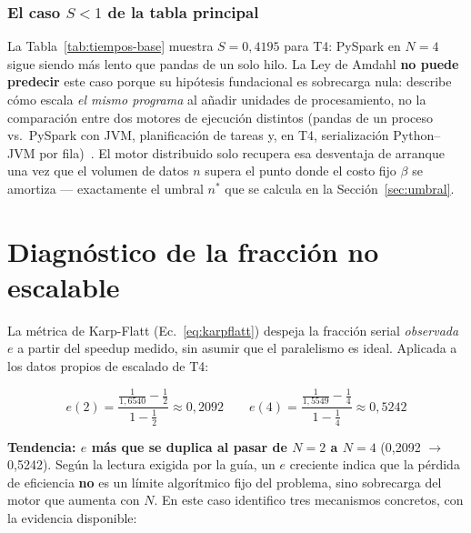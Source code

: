 \documentclass[11pt,a4paper]{article}
\begin{document}
\subsubsection{El caso \texorpdfstring{$S<1$}{S<1} de la tabla principal}
\label{sec:pregunta-s}

La Tabla~\ref{tab:tiempos-base} muestra \(S=0{,}4195\) para T4: PySpark en \(N=4\) sigue siendo
más lento que pandas de un solo hilo. La Ley de Amdahl \textbf{no puede predecir} este caso
porque su hipótesis fundacional es sobrecarga nula: describe cómo escala \emph{el mismo
programa} al añadir unidades de procesamiento, no la comparación entre dos motores de ejecución
distintos (pandas de un proceso vs.\ PySpark con JVM, planificación de tareas y, en T4,
serialización Python--JVM por fila)~\cite{hillmarty2008amdahl}. El motor distribuido solo
recupera esa desventaja de arranque una vez que el volumen de datos \(n\) supera el punto donde
el costo fijo \(\beta\) se amortiza --- exactamente el umbral \(n^{*}\) que se calcula en la
Sección~\ref{sec:umbral}.

\section{Diagnóstico de la fracción no escalable}
\label{sec:karpflatt}

La métrica de Karp-Flatt (Ec.~\ref{eq:karpflatt}) despeja la fracción serial \emph{observada}
\(e\) a partir del speedup medido, sin asumir que el paralelismo es ideal. Aplicada a los datos
propios de escalado de T4:

\[
e(2) = \frac{\tfrac{1}{1{,}6540}-\tfrac{1}{2}}{1-\tfrac{1}{2}} \approx 0{,}2092
\qquad
e(4) = \frac{\tfrac{1}{1{,}5549}-\tfrac{1}{4}}{1-\tfrac{1}{4}} \approx 0{,}5242
\]

\textbf{Tendencia: \(e\) más que se duplica al pasar de \(N=2\) a \(N=4\)} (0,2092
\(\to\) 0,5242). Según la lectura exigida por la guía, un \(e\) creciente indica que la
pérdida de eficiencia \textbf{no} es un límite algorítmico fijo del problema, sino sobrecarga
del motor que aumenta con \(N\). En este caso identifico tres mecanismos concretos, con la
evidencia disponible:
\end{document}
